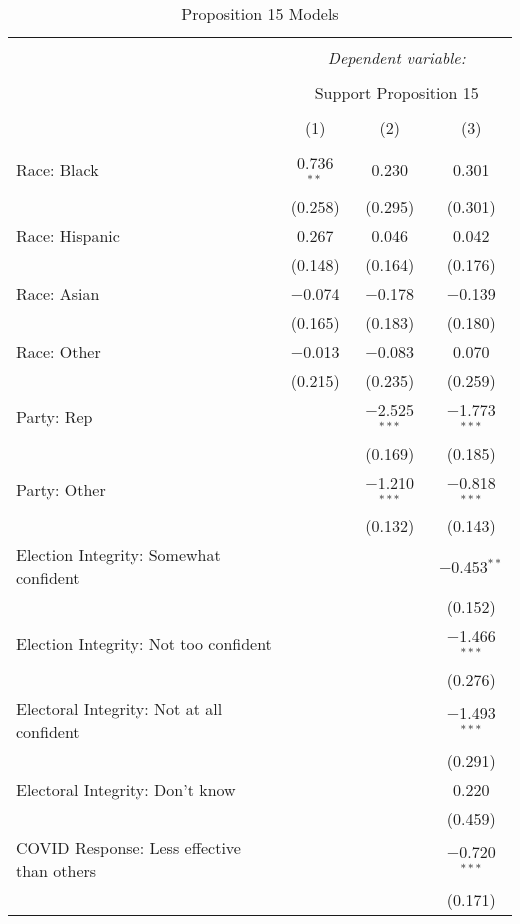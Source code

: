 
\begin{table}[!htbp] \centering 
  \caption{Proposition 15 Models} 
  \label{tab:reg_prop15_short} 
\footnotesize 
\begin{tabular}{@{\extracolsep{5pt}}lccc} 
\\[-1.8ex]\hline 
\hline \\[-1.8ex] 
 & \multicolumn{3}{c}{\textit{Dependent variable:}} \\ 
\cline{2-4} 
\\[-1.8ex] & \multicolumn{3}{c}{Support Proposition 15} \\ 
\\[-1.8ex] & (1) & (2) & (3)\\ 
\hline \\[-1.8ex] 
 Race: Black & 0.736$^{**}$ & 0.230 & 0.301 \\ 
  & (0.258) & (0.295) & (0.301) \\ 
  Race: Hispanic & 0.267 & 0.046 & 0.042 \\ 
  & (0.148) & (0.164) & (0.176) \\ 
  Race: Asian & $-$0.074 & $-$0.178 & $-$0.139 \\ 
  & (0.165) & (0.183) & (0.180) \\ 
  Race: Other & $-$0.013 & $-$0.083 & 0.070 \\ 
  & (0.215) & (0.235) & (0.259) \\ 
  Party: Rep &  & $-$2.525$^{***}$ & $-$1.773$^{***}$ \\ 
  &  & (0.169) & (0.185) \\ 
  Party: Other &  & $-$1.210$^{***}$ & $-$0.818$^{***}$ \\ 
  &  & (0.132) & (0.143) \\ 
  Election Integrity: Somewhat confident &  &  & $-$0.453$^{**}$ \\ 
  &  &  & (0.152) \\ 
  Election Integrity: Not too confident &  &  & $-$1.466$^{***}$ \\ 
  &  &  & (0.276) \\ 
  Electoral Integrity: Not at all confident &  &  & $-$1.493$^{***}$ \\ 
  &  &  & (0.291) \\ 
  Electoral Integrity: Don't know &  &  & 0.220 \\ 
  &  &  & (0.459) \\ 
  COVID Response: Less effective than others &  &  & $-$0.720$^{***}$ \\ 
  &  &  & (0.171) \\ 

\end{tabular}
\end{table}
